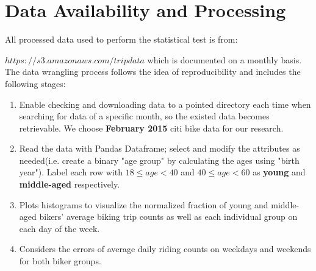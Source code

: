 \documentclass[a4paper, 11pt]{article} %
\begin{document}

\section*{Data Availability and Processing}
\setlength{\parindent}{0pt}
All processed data used to perform the statistical test is from:

$https://s3.amazonaws.com/tripdata$ which is documented on a monthly basis. The data wrangling process follows the idea of reproducibility and includes the following stages:
\begin{enumerate}
\item Enable checking and downloading data to a pointed directory each time when searching for data of a specific month, so the existed data becomes retrievable. We choose \textbf{February 2015} citi bike data for our research.
\item Read the data with Pandas Dataframe; select and modify the attributes as needed(i.e. create a binary "age group" by calculating the ages using "birth year"). Label each row with $ 18 \leqslant age < 40$ and $ 40 \leqslant age < 60$ as \textbf{young} and \textbf{middle-aged} respectively.
\item Plots histograms to visualize the normalized fraction of young and middle-aged bikers' average biking trip counts as well as each individual group on each day of the week.
\item Considers the errors of average daily riding counts on weekdays and weekends for both biker groups.
\end{enumerate}



\end{document}
